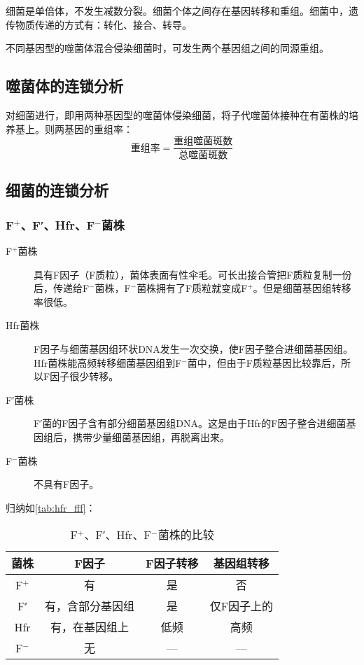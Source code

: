 细菌是单倍体，不发生减数分裂。细菌个体之间存在基因转移和重组。细菌中，遗传物质传递的方式有：转化、接合、转导。

不同基因型的噬菌体混合侵染细菌时，可发生两个基因组之间的同源重组。

\subsection{噬菌体的连锁分析}

对细菌进行，即用两种基因型的噬菌体侵染细菌，将子代噬菌体接种在有菌株的培养基上。则两基因的重组率：\[\text{重组率}=\frac{\text{重组噬菌斑数}}{\text{总噬菌斑数}}\]

\subsection{细菌的连锁分析}

\subsubsection{F$^{+}$、F′、Hfr、F$^{-}$菌株}

\begin{description}
	\item[F$^{+}$菌株] 具有F因子（F质粒），菌体表面有性伞毛。可长出接合管把F质粒复制一份后，传递给F$^{-}$菌株，F$^{-}$菌株拥有了F质粒就变成F$^{+}$。但是细菌基因组转移率很低。
	\item[Hfr菌株] F因子与细菌基因组环状DNA发生一次交换，使F因子整合进细菌基因组。Hfr菌株能高频转移细菌基因组到F$^{-}$菌中，但由于F质粒基因比较靠后，所以F因子很少转移。
	\item[F′菌株] F′菌的F因子含有部分细菌基因组DNA。这是由于Hfr的F因子整合进细菌基因组后，携带少量细菌基因组，再脱离出来。
	\item[F$^{-}$菌株] 不具有F因子。
\end{description}

归纳如\autoref{tab:hfr_fff}：

\begin{table}[htbp]
	\centering
	\begin{tabularx}{\textwidth}{|c|C|C|C|}
		\hline
		\textbf{菌株} & \textbf{F因子} & \textbf{F因子转移} & \textbf{基因组转移} \\ \hline
		F$^{+}$ & 有 & 是 & 否 \\ \hline
		F′ & 有，含部分基因组 & 是 & 仅F因子上的 \\ \hline
		Hfr & 有，在基因组上 & 低频 & 高频 \\ \hline
		F$^{-}$ & 无 & --- & --- \\ \hline
	\end{tabularx}
	\caption{F$^{+}$、F′、Hfr、F$^{-}$菌株的比较}
	\label{tab:hfr_fff}
\end{table}

